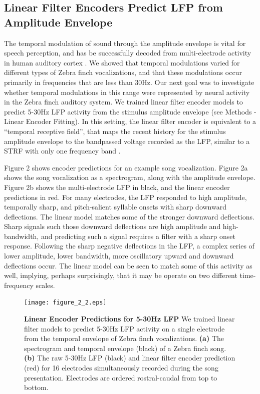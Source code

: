 \subsection{Linear Filter Encoders Predict LFP from Amplitude Envelope}

The temporal modulation of sound through the amplitude envelope is vital for speech perception, and has be successfully decoded from multi-electrode activity in human auditory cortex \cite{Pasley2012}. We showed that temporal modulations varied for different types of Zebra finch vocalizations, and that these modulations occur primarily in frequencies that are less than 30Hz. Our next goal was to investigate whether temporal modulations in this range were represented by neural activity in the Zebra finch auditory system. We trained linear filter encoder models to predict 5-30Hz LFP activity from the stimulus amplitude envelope (see Methods - Linear Encoder Fitting). In this setting, the linear filter encoder is equivalent to a ``temporal receptive field'', that maps the recent history for the stimulus amplitude envelope to the bandpassed voltage recorded as the LFP, similar to a STRF with only one frequency band \cite{Theunissen2000}.

    Figure 2 shows encoder predictions for an example song vocalization. Figure 2a shows the song vocalization as a spectrogram, along with the amplitude envelope. Figure 2b shows the multi-electrode LFP in black, and the linear encoder predictions in red.  For many electrodes, the LFP responded to high amplitude, temporally sharp, and pitch-salient syllable onsets with sharp downward deflections. The linear model matches some of the stronger downward deflections. Sharp signals such those downward deflections are high amplitude and high-bandwidth, and predicting such a signal requires a filter with a sharp onset response. Following the sharp negative deflections in the LFP, a complex series of lower amplitude, lower bandwidth, more oscillatory upward and downward deflections occur. The linear model can be seen to match some of this activity as well, implying, perhaps surprisingly, that it may be operate on two different time-frequency scales.

\begin{figure}
    \caption{\textbf{Linear Encoder Predictions for 5-30Hz LFP} We trained linear filter models to predict 5-30Hz LFP activity on a single electrode from the temporal envelope of Zebra finch vocalizations. \textbf{(a)} The spectrogram and temporal envelope (black) of a Zebra finch song. \textbf{(b)} The raw 5-30Hz LFP (black) and linear filter encoder prediction (red) for 16 electrodes simultaneously recorded during the song presentation. Electrodes are ordered rostral-caudal from top to bottom.}
    \centering
    \texttt{[image: figure\_2\_2.eps]}
\end{figure}

